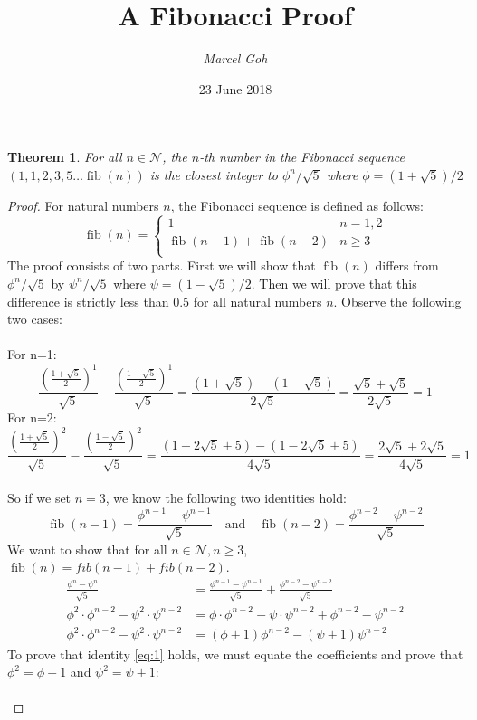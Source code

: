 \documentclass{article}
\title{\huge{\textbf{A Fibonacci Proof}}}
\author{\large{\textit{Marcel Goh}}}
\date{23 June 2018}
\newtheorem*{theorem}{Theorem}
\DeclareMathOperator{\fib}{fib}
\begin{document}
\maketitle

\begin{theorem}
    For all $n\in\mathcal{N}$, the $n$-th number in the Fibonacci sequence $(1,1,2,3,5\ldots\fib(n))$ is the closest integer to $\phi^n/\sqrt{5}$ where $\phi = (1+\sqrt{5})/2$
\end{theorem}
\begin{proof}
    For natural numbers $n$, the Fibonacci sequence is defined as follows:
    $$\fib(n)=\begin{cases}
                  1 & n=1,2\\
                  \fib(n-1)+\fib(n-2) & n\geq3\\
              \end{cases}$$
    The proof consists of two parts. First we will show that $\fib(n)$ differs from $\phi^n/\sqrt{5}$ by $\psi^n/\sqrt{5}$ where $\psi = (1-\sqrt{5})/2$. Then we will prove that this difference is strictly less than 0.5 for all natural numbers $n$. Observe the following two cases:\\ \\
    For n=1:
    $$\frac{(\frac{1+\sqrt{5}}{2})^1}{\sqrt{5}} - \frac{(\frac{1-\sqrt{5}}{2})^1}{\sqrt{5}} = \frac{(1+\sqrt{5})-(1-\sqrt{5})}{2\sqrt{5}} = \frac{\sqrt{5} + \sqrt{5}}{2\sqrt{5}} = 1$$
    For n=2:
    $$\frac{(\frac{1+\sqrt{5}}{2})^2}{\sqrt{5}} - \frac{(\frac{1-\sqrt{5}}{2})^2}{\sqrt{5}} = \frac{(1+2\sqrt{5}+5)-(1-2\sqrt{5}+5)}{4\sqrt{5}} = \frac{2\sqrt{5} + 2\sqrt{5}}{4\sqrt{5}} = 1$$\\
    So if we set $n=3$, we know the following two identities hold:
    $$\fib(n-1) = \frac{\phi^{n-1}-\psi^{n-1}}{\sqrt{5}} \quad \text{and} \quad \fib(n-2) = \frac{\phi^{n-2}-\psi^{n-2}}{\sqrt{5}}$$
    We want to show that for all $n\in\mathcal{N},n\geq3$, $\fib(n) = fib(n-1)+fib(n-2)$.
    \begin{align} \label{eq:1}
        \frac{\phi^n-\psi^n}{\sqrt{5}} &= \frac{\phi^{n-1}-\psi^{n-1}}{\sqrt{5}} + \frac{\phi^{n-2}-\psi^{n-2}}{\sqrt{5}} \nonumber \\
        \phi^2\cdot\phi^{n-2}-\psi^2\cdot\psi^{n-2} &= \phi\cdot\phi^{n-2}-\psi\cdot\psi^{n-2} + \phi^{n-2} - \psi^{n-2} \nonumber \\
        \phi^2\cdot\phi^{n-2}-\psi^2\cdot\psi^{n-2} &= (\phi+1)\phi^{n-2}-(\psi+1)\psi^{n-2}
    \end{align}
    To prove that identity \eqref{eq:1} holds, we must equate the coefficients and prove that $\phi^2 = \phi+1$ and $\psi^2 = \psi + 1$:\\\\

\end{proof}
\end{document}
